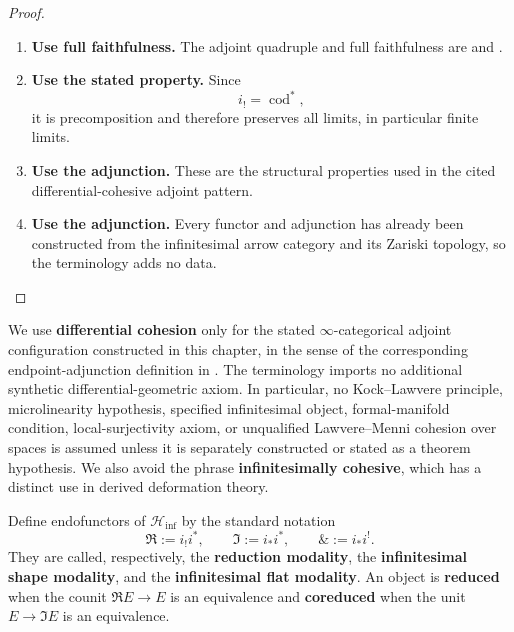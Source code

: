 \begin{proof}
\leavevmode
\begin{enumerate}[label=\textup{(\arabic*)}]
    \item \textbf{Use full faithfulness.}
    The adjoint quadruple and full faithfulness are
     and
    .

    \item \textbf{Use the stated property.}
    Since
    \[
        i_!=\operatorname{cod}^*,
    \]
    it is precomposition and therefore preserves all limits, in particular finite limits.

    \item \textbf{Use the adjunction.}
    These are the structural properties used in the cited differential-cohesive adjoint pattern.

    \item \textbf{Use the adjunction.}
    Every functor and adjunction has already been constructed from the infinitesimal arrow
    category and its Zariski topology, so the terminology adds no data.
\end{enumerate}
\end{proof}

\begin{remark}
\label{rem:differential-cohesion-qualified}
We use \textbf{differential cohesion} only for the stated
\(\infty\)-categorical adjoint configuration constructed in this chapter, in
the sense of the corresponding endpoint-adjunction definition in
\cite[Definition~2.15]{KhavkineSchreiber2017}. The terminology imports no
additional synthetic differential-geometric axiom. In particular, no
Kock--Lawvere principle, microlinearity hypothesis, specified infinitesimal
object, formal-manifold condition, local-surjectivity axiom, or unqualified
Lawvere--Menni cohesion over spaces is assumed unless it is separately
constructed or stated as a theorem hypothesis. We also avoid the phrase
\textbf{infinitesimally cohesive}, which has a distinct use in derived
deformation theory.
\end{remark}

\begin{definition}
\label{def:differential-cohesive-endpoint-constructions}
Define endofunctors of \(\mathcal H_{\inf}\) by the standard notation
\[
    \Re:=i_!i^*,
    \qquad
    \Im:=i_*i^*,
    \qquad
    \&:=i_*i^!.
\]
They are called, respectively, the \textbf{reduction modality}, the
\textbf{infinitesimal shape modality}, and the \textbf{infinitesimal flat
modality}. An object is \textbf{reduced} when the counit
\(\Re E\to E\) is an equivalence and \textbf{coreduced} when the unit
\(E\to\Im E\) is an equivalence.
\end{definition}

